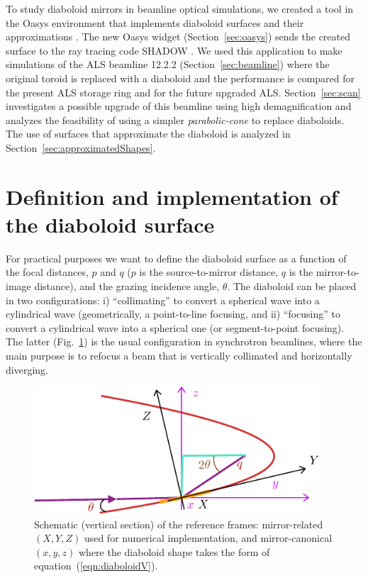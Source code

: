 \documentclass[preprint]{iucr}       %
\begin{document}

To study diaboloid mirrors in beamline optical simulations, we created a tool in the Oasys environment \cite{codeOASYS} that implements diaboloid surfaces and their approximations \cite{valSPIE} \cite{val2021}. The new Oasys widget (Section~\ref{sec:oasys}) sends the created surface to the ray tracing code SHADOW \cite{codeSHADOW}. We used this application to make simulations of the ALS beamline 12.2.2 (Section~\ref{sec:beamline}) where the original toroid is replaced with a diaboloid and the performance is compared for the present ALS storage ring and for the future upgraded ALS. Section~\ref{sec:scan} investigates a possible upgrade of this beamline using high demagnification and analyzes the feasibility of using a simpler \emph{parabolic-cone} to replace diaboloids. The use of surfaces that approximate the diaboloid is analyzed in Section~\ref{sec:approximatedShapes}.

\section{Definition and implementation of the diaboloid surface}
\label{sec:DiaboloidEqs}

For practical purposes we want to define the diaboloid surface as a function of the focal distances, $p$ and $q$ ($p$ is the source-to-mirror distance, $q$ is the mirror-to-image distance), and the grazing incidence angle, $\theta$. The diaboloid can be placed in two configurations: i) ``collimating'' to convert a spherical wave into a cylindrical wave (geometrically, a point-to-line focusing, and ii) ``focusing'' to convert a cylindrical wave into a spherical one (or segment-to-point focusing). The latter (Fig.~\ref{fig:frame}) is the usual configuration in synchrotron beamlines, where the main purpose is to refocus a beam that is vertically collimated and horizontally diverging. 


\begin{figure}\label{fig:frame}
\includegraphics[width=0.95\textwidth]{figures/fig1.pdf}
%
\caption{Schematic (vertical section) of the reference frames: mirror-related $(X,Y,Z)$ used for numerical implementation, and mirror-canonical $(x,y,z)$ where the diaboloid shape takes the form of equation~(\ref{eqn:diaboloidV}). }
\end{figure}
\end{document}
